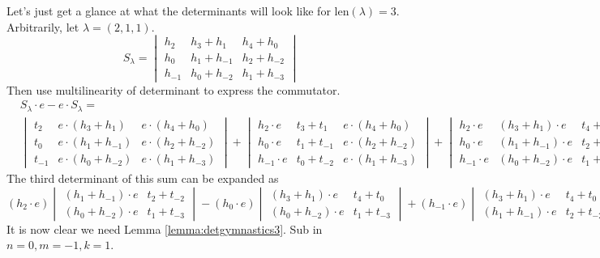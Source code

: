 \begin{example}
Let's just get a glance at what the determinants will look like for $\textrm{len}(\lambda)=3$. Arbitrarily, let $\lambda = (2, 1, 1)$. 
\[
S_\lambda = 
\begin{vmatrix}
h_2 & h_3 + h_1 & h_4 + h_0 \\
h_0 & h_1 + h_{-1} & h_2 + h_{-2} \\
h_{-1} & h_0 + h_{-2} & h_1 + h_{-3}
\end{vmatrix}
\]
Then use multilinearity of determinant to express the commutator.
\begin{equation*}
\begin{split}
&S_\lambda \cdot e - e \cdot S_\lambda = \\
&\begin{vmatrix}
t_2 & e \cdot (h_3 + h_1 ) & e \cdot ( h_4 + h_0 ) \\
t_0 & e \cdot ( h_1 + h_{-1} ) & e \cdot ( h_2  + h_{-2} ) \\
t_{-1} & e \cdot ( h_0 + h_{-2} ) & e \cdot ( h_1 + h_{-3} )
\end{vmatrix}
+
\begin{vmatrix}
h_2 \cdot e & t_3 + t_1 & e \cdot ( h_4 + h_0 ) \\
h_0 \cdot e & t_1 + t_{-1} & e \cdot ( h_2  + h_{-2} ) \\
h_{-1} \cdot e & t_0 + t_{-2} & e \cdot ( h_1 + h_{-3} )
\end{vmatrix}
+
\begin{vmatrix}
h_2 \cdot e & ( h_3 + h_1 ) \cdot e & t_4 + t_0 \\
h_0 \cdot e & ( h_1 + h_{-1} ) \cdot e & t_2  + t_{-2} ) \\
h_{-1} \cdot e & ( h_0 + h_{-2} ) \cdot e & t_1 + t_{-3}
\end{vmatrix}
\end{split}
\end{equation*}
The third determinant of this sum can be expanded as
\[
( h_2 \cdot e )
\begin{vmatrix}
( h_1 + h_{-1} ) \cdot e & t_2 + t_{-2} \\
( h_0 + h_{-2} ) \cdot e & t_1 + t_{-3}
\end{vmatrix}
- ( h_0 \cdot e ) 
\begin{vmatrix}
( h_3 + h_1 ) \cdot e & t_4 + t_0 \\
( h_0 + h_{-2} ) \cdot e & t_1 + t_{-3}
\end{vmatrix}
+ ( h_{-1} \cdot e ) 
\begin{vmatrix}
( h_3 + h_1 ) \cdot e & t_4 + t_0 \\
( h_1 + h_{-1}) \cdot e & t_2 + t_{-2}
\end{vmatrix}
\]
It is now clear we need Lemma \ref{lemma:detgymnastics3}. Sub in $n=0, m=-1, k=1$.

\end{example}



